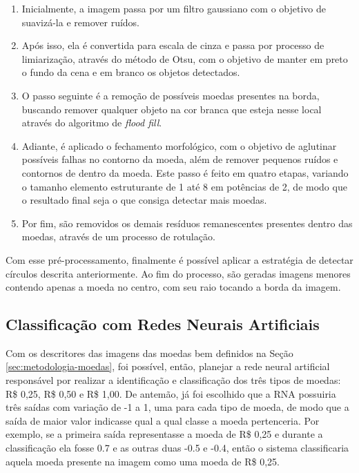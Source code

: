 \documentclass[10pt,journal,compsoc]{IEEEtran}
\begin{document}
\begin{enumerate}

\item Inicialmente, a imagem passa por um filtro gaussiano com o objetivo de suavizá-la e remover ruídos.
\item Após isso, ela é convertida para escala de cinza e passa por processo de limiarização, através do método de Otsu, com o objetivo de manter em preto o fundo da cena e em branco os objetos detectados.
\item O passo seguinte é a remoção de possíveis moedas presentes na borda, buscando remover qualquer objeto na cor branca que esteja nesse local através do algoritmo de \textit{flood fill}.
\item Adiante, é aplicado o fechamento morfológico, com o objetivo de aglutinar possíveis falhas no contorno da moeda, além de remover pequenos ruídos e contornos de dentro da moeda. Este passo é feito em quatro etapas, variando o tamanho elemento estruturante de 1 até 8 em potências de 2, de modo que o resultado final seja o que consiga detectar mais moedas.
\item Por fim, são removidos os demais resíduos remanescentes presentes dentro das moedas, através de um processo de rotulação. 
\end{enumerate}

Com esse pré-processamento, finalmente é possível aplicar a estratégia de detectar círculos descrita anteriormente. Ao fim do processo, são geradas imagens menores contendo apenas a moeda no centro, com seu raio tocando a borda da imagem.

\subsection{Classificação com Redes Neurais Artificiais}
\label{sec:metodologia-rna}


Com os descritores das imagens das moedas bem definidos na Seção \ref{sec:metodologia-moedas}, foi possível, então, planejar a rede neural artificial responsável por realizar a identificação e classificação dos três tipos de moedas: R\$ 0,25, R\$ 0,50 e R\$ 1,00. De antemão, já foi escolhido que a RNA possuiria três saídas com variação de -1 a 1, uma para cada tipo de moeda, de modo que a saída de maior valor indicasse qual a qual classe a moeda pertenceria. Por exemplo, se a primeira saída representasse a moeda de R\$ 0,25 e durante a classificação ela fosse 0.7 e as outras duas -0.5 e -0.4, então o sistema classificaria aquela moeda presente na imagem como uma moeda de R\$ 0,25.
\end{document}
